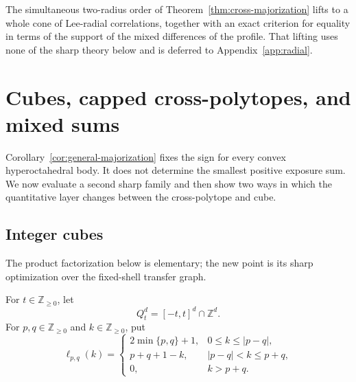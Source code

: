 \documentclass[pdflatex,sn-mathphys-num]{sn-jnl}
\theoremstyle{thmstyleone}
\theoremstyle{thmstylethree}
\theoremstyle{thmstyletwo}
\newcommand{\Z}{\mathbb Z}
\begin{document}
The simultaneous two-radius order of Theorem~\ref{thm:cross-majorization}
lifts to a whole cone of Lee-radial correlations, together with an exact
criterion for equality in terms of the support of the mixed differences of
the profile.  That lifting uses none of the sharp theory below and is
deferred to Appendix~\ref{app:radial}.

\section{Cubes, capped cross-polytopes, and mixed sums}
\label{sec:polytope-phases}

Corollary~\ref{cor:general-majorization} fixes the sign for every convex
hyperoctahedral body.  It does not determine the smallest positive exposure
sum.  We now evaluate a second sharp family and then show two ways in which
the quantitative layer changes between the cross-polytope and cube.

\subsection{Integer cubes}

The product factorization below is elementary; the new point is its sharp
optimization over the fixed-shell transfer graph.

For $t\in\Z_{\ge0}$, let
\[
 Q_t^d=[-t,t]^d\cap\Z^d.
\]
For $p,q\in\Z_{\ge0}$ and $k\in\Z_{\ge0}$, put
\begin{equation}
 \ell_{p,q}(k)=
 \begin{cases}
  2\min\{p,q\}+1,&0\le k\le|p-q|,\\
  p+q+1-k,&|p-q|<k\le p+q,\\
  0,&k>p+q.
 \end{cases}
 \label{eq:cube-one-dimensional-overlap}
\end{equation}
\end{document}

